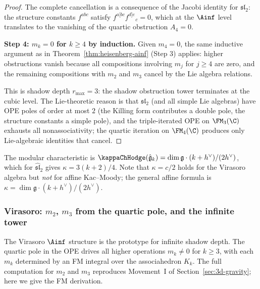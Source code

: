 \begin{proof}
The complete cancellation is a consequence of the Jacobi
identity for $\mathfrak{sl}_2$: the structure constants
$f^{abc}$ satisfy $f^{a[bc} f^{d]e}_{\;\;\;\;\; c} = 0$,
which at the $\Ainf$ level translates to the vanishing
of the quartic obstruction $A_4 = 0$.

\medskip
\textbf{Step 4: $m_k = 0$ for $k \ge 4$ by induction.}
Given $m_4 = 0$, the same inductive argument as in
Theorem~\ref{thm:heisenberg-ainf} (Step 3) applies:
higher obstructions vanish because all compositions
involving $m_j$ for $j \ge 4$ are zero, and the
remaining compositions with $m_2$ and $m_3$ cancel
by the Lie algebra relations.

This is shadow depth $r_{\max} = 3$: the shadow obstruction tower
terminates at the cubic level. The Lie-theoretic reason is
that $\mathfrak{sl}_2$ (and all simple Lie algebras)
have OPE poles of order at most $2$ (the Killing form
contributes a double pole, the structure constants a
simple pole), and the triple-iterated OPE on
$\FM_3(\C)$ exhausts all nonassociativity; the quartic
iteration on $\FM_4(\C)$ produces only Lie-algebraic
identities that cancel.
\end{proof}

\begin{remark}
The modular characteristic is
$\kappaChHodge(\hat{\mathfrak{g}}_k) = \dim\mathfrak{g}\cdot
(k + h^\vee) / (2h^\vee)$, which for
$\hat{\mathfrak{sl}}_2$ gives
$\kappa = 3(k+2) / 4$. Note that $\kappa = c/2$ holds for
the Virasoro algebra but \emph{not} for affine Kac--Moody;
the general affine formula is
$\kappa = \dim\mathfrak{g}\cdot(k + h^\vee)/(2h^\vee)$.
\end{remark}


\subsubsection{Virasoro: $m_2$, $m_3$ from the quartic
pole, and the infinite tower}

The Virasoro $\Ainf$ structure is the prototype for
infinite shadow depth. The quartic pole in the OPE
drives all higher operations $m_k \ne 0$ for $k \ge 3$,
with each $m_k$ determined by an FM integral over
the associahedron $K_k$. The full computation for
$m_2$ and $m_3$ reproduces Movement~I of
Section~\ref{sec:3d-gravity}; here we give the FM
derivation.

